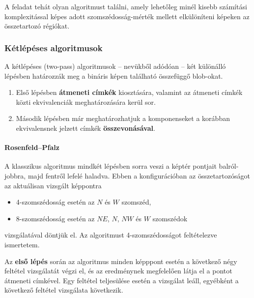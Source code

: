 \bigskip

A feladat tehát olyan algoritmust találni, amely lehetőleg minél kisebb számítási komplexitással képes adott szomszédosság-mérték mellett elkülöníteni képeken az összetartozó régiókat.

\subsubsection{Kétlépéses algoritmusok}\label{sect:blob_ketlepes}

A kétlépéses (two-pass) algoritmusok -- nevükből adódóan -- két különálló lépésben határozzák meg a bináris képen található összefüggő blob-okat.

\begin{enumerate}
  \item Első lépésben \textbf{átmeneti címkék} kiosztására, valamint az átmeneti címkék közti ekvivalenciák meghatározására kerül sor.
  \item Második lépésben már meghatározhatjuk a komponenseket a korábban ekvivalensnek jelzett címkék \textbf{összevonásával}.
\end{enumerate}


\paragraph{Rosenfeld--Pfalz}

A klasszikus algoritmus \cite{rosenfeld} mindkét lépésben sorra veszi a képtér pontjait balról-jobbra, majd fentről lefelé haladva. Ebben a konfigurációban az összetartozóságot az aktuálisan vizsgált képpontra

\begin{itemize}
  \item 4-szomszédosság esetén az $N$ és $W$ szomszéd,
  \item 8-szomszédosság esetén az $NE$, $N$, $NW$ és $W$ szomszédok
\end{itemize}

vizsgálatával döntjük el. Az algoritmust 4-szomszédosságot feltételezve ismertetem.

\bigskip

Az \textbf{első lépés} során az algoritmus minden képppont esetén a következő négy feltétel vizsgálatát végzi el, és az eredménynek megfelelően látja el a pontot átmeneti címkével. Egy feltétel teljesülése esetén a vizsgálat leáll, egyébként a következő feltétel vizsgálata következik.

